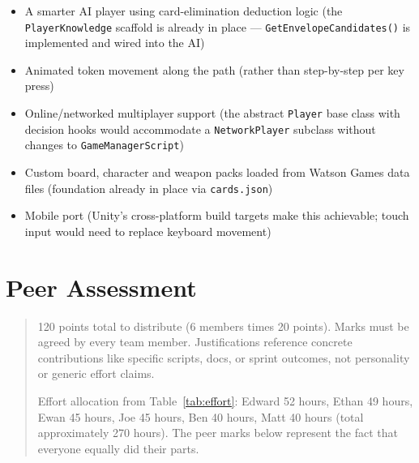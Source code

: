 \begin{itemize}
    \item A smarter AI player using card-elimination deduction logic (the \texttt{PlayerKnowledge} scaffold is already in place --- \texttt{GetEnvelopeCandidates()} is implemented and wired into the AI)
    \item Animated token movement along the path (rather than step-by-step per key press)
    \item Online/networked multiplayer support (the abstract \texttt{Player} base class with decision hooks would accommodate a \texttt{NetworkPlayer} subclass without changes to \texttt{GameManagerScript})
    \item Custom board, character and weapon packs loaded from Watson Games data files (foundation already in place via \texttt{cards.json})
    \item Mobile port (Unity's cross-platform build targets make this achievable; touch input would need to replace keyboard movement)
\end{itemize}

\section{Peer Assessment}
\label{sec:peer-assessment}

\begin{quote}
120 points total to distribute (6 members times 20 points). Marks must be agreed by every team member. Justifications reference concrete contributions like specific scripts, docs, or sprint outcomes, not personality or generic effort claims.

Effort allocation from Table~\ref{tab:effort}: Edward 52 hours, Ethan 49 hours, Ewan 45 hours, Joe 45 hours, Ben 40 hours, Matt 40 hours (total approximately 270 hours). The peer marks below represent the fact that everyone equally did their parts.
\end{quote}

